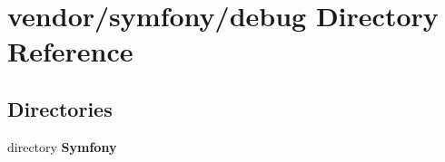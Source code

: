 \section{vendor/symfony/debug Directory Reference}
\label{dir_c4067a39930e51dd3408d9d0c2f7fdeb}
\subsection*{Directories}
\begin{DoxyCompactItemize}
\item 
directory {\bf Symfony}
\end{DoxyCompactItemize}
